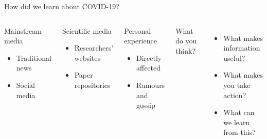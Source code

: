\begin{frame}{How did we learn about COVID-19?}

\begin{columns}[t]
    \begin{block}{Mainstream media}
        \begin{itemize}
            \item Traditional news
            \item Social media
        \end{itemize}
    \end{block}
    
    \begin{block}{Scientific media}
        \begin{itemize}
            \item Researchers' websites
            \item Paper repositories
        \end{itemize}
    \end{block}
    
     \begin{block}{Personal experience}
        \begin{itemize}
            \item Directly affected
            \item Rumours and gossip
        \end{itemize}
    \end{block}
    

    What do you think?

    \begin{itemize}
        \item What makes information useful?
        \item What makes you take action?
        \item What can we learn from this?
    \end{itemize}
        
\end{columns}    

\end{frame}


